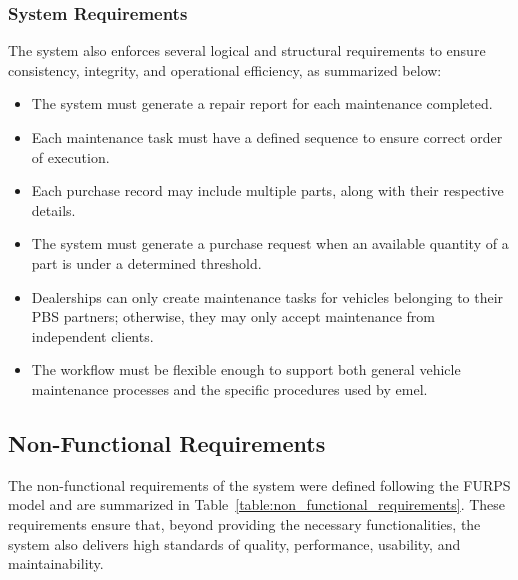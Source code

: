 \subsubsection{System Requirements}

The system also enforces several logical and structural requirements to ensure consistency, integrity, and operational efficiency, as summarized below:

\begin{itemize}
    \item The system must generate a repair report for each maintenance completed.
    \item Each maintenance task must have a defined sequence to ensure correct order of execution.
    \item Each purchase record may include multiple parts, along with their respective details.
    \item The system must generate a purchase request when an available quantity of a part is under a determined threshold. 
    \item Dealerships can only create maintenance tasks for vehicles belonging to their \acs{PBS} partners; otherwise, they may only accept maintenance from independent clients.
    \item The workflow must be flexible enough to support both general vehicle maintenance processes and the specific procedures used by \acs{emel}.
\end{itemize}



\subsection{Non-Functional Requirements}

The non-functional requirements of the system were defined following the FURPS model and are summarized in Table~\ref{table:non_functional_requirements}. These requirements ensure that, beyond providing the necessary functionalities, the system also delivers high standards of quality, performance, usability, and maintainability.


